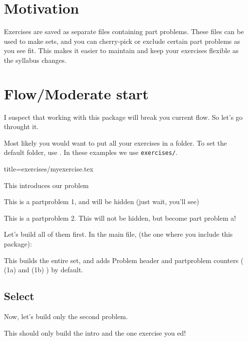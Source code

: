 \section{Motivation}
Exercises are saved as separate files containing part problems. These files can be used to make sets, and you can cherry-pick or exclude certain part problems as you see fit. This makes it easier to maintain and keep your exercises flexible as the syllabus changes.

\section{Flow/Moderate start}
I suspect that working with this package will break you current flow. So let's go throught it.

Most likely you would want to put all your exercises in a folder. To set the default folder, use .
In these examples we use \texttt{exercises/}.
\begin{dispListing*}{title=exercises/myexercise.tex}
\begin{intro}
  This introduces our problem
\end{intro}
\begin{problem}
  This is a partproblem 1,
  and will be hidden (just wait, you'll see)
\end{problem}
\begin{problem}
  This is a partproblem 2.
  This will not be hidden, but become part problem a!
\end{problem}
\end{dispListing*}
Let's build all of them first. In the main file, (the one where you include this package):
This builds the entire set, and adds Problem header and partproblem counters ( (1a) and (1b) ) by default.
\subsection{Select}
Now, let's build only the second problem.
This should only build the intro and the one exercise you ed!

